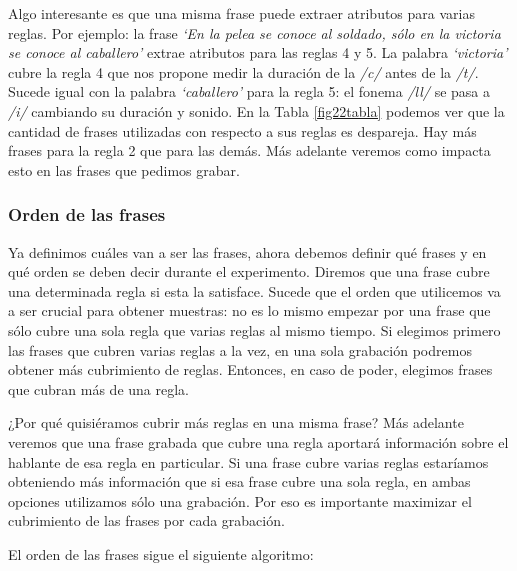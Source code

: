 Algo interesante es que una misma frase puede extraer atributos para varias reglas. Por ejemplo: la frase \textit{`En la pelea se conoce al soldado, sólo en la victoria se conoce al caballero’} extrae atributos para las reglas 4 y 5. La palabra \textit{`victoria’} cubre la regla 4 que nos propone medir la duración de la \textit{/c/} antes de la \textit{/t/}. Sucede igual con la palabra \textit{`caballero’} para la regla 5: el fonema \textit{/ll/} se pasa a \textit{/i/} cambiando su duración y sonido. En la Tabla \ref{fig22tabla} podemos ver que la cantidad de frases utilizadas con respecto a sus reglas es despareja. Hay más frases para la regla 2 que para las demás. Más adelante veremos como impacta esto en las frases que pedimos grabar.


\subsubsection{Orden de las frases}

Ya definimos cuáles van a ser las frases, ahora debemos definir qué frases y en qué orden se deben decir durante el experimento. Diremos que una frase cubre una determinada regla si esta la satisface. Sucede que el orden que utilicemos va a ser crucial para obtener muestras: no es lo mismo empezar por una frase que sólo cubre una sola regla que varias reglas al mismo tiempo. Si elegimos primero las frases que cubren varias reglas a la vez, en una sola grabación podremos obtener más cubrimiento de reglas. Entonces, en caso de poder, elegimos frases que cubran más de una regla. 

¿Por qué quisiéramos cubrir más reglas en una misma frase? Más adelante veremos que una frase grabada que cubre una regla aportará información sobre el hablante de esa regla en particular. Si una frase cubre varias reglas estaríamos obteniendo más información que si esa frase cubre una sola regla, en ambas opciones utilizamos sólo una grabación. Por eso es importante maximizar el cubrimiento de las frases por cada grabación.  

El orden de las frases sigue el siguiente algoritmo:

